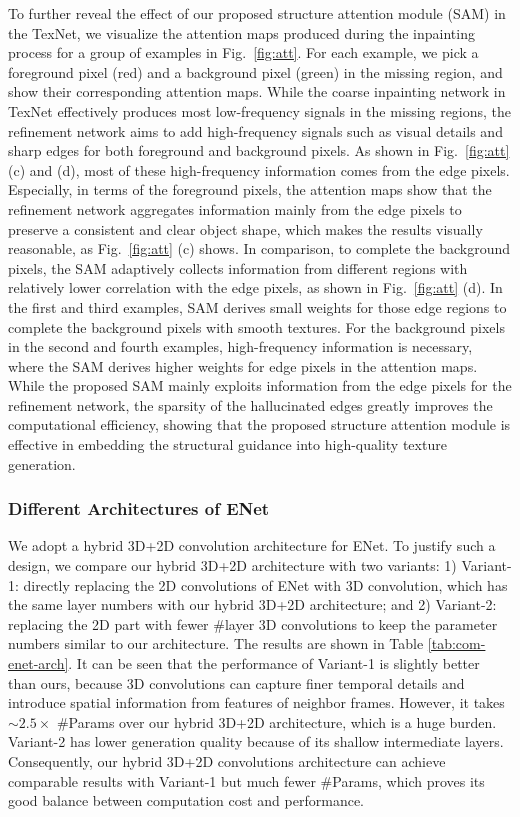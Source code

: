 To further reveal the effect of our proposed structure attention module (SAM) in the TexNet, we visualize the attention maps produced during the inpainting process for a group of examples in Fig.~\ref{fig:att}.
For each example, we pick a foreground pixel (red) and a background pixel (green) in the missing region, and show their corresponding attention maps.
%
While the coarse inpainting network in TexNet effectively produces most low-frequency signals in the missing regions, the refinement network aims to add high-frequency signals such as visual details and sharp edges for both foreground and background pixels.
%
As shown in Fig.~\ref{fig:att} (c) and (d), most of these high-frequency information comes from the edge pixels.
%
Especially, in terms of the foreground pixels, the attention maps show that the refinement network aggregates information mainly from the edge pixels to preserve a consistent and clear object shape, which makes the results visually reasonable, as Fig.~\ref{fig:att} (c) shows.
In comparison, to complete the background pixels, the SAM adaptively collects information from different regions with relatively lower correlation with the edge pixels, as shown in Fig.~\ref{fig:att} (d).
%
In the first and third examples, SAM derives small weights for those edge regions to complete the background pixels with smooth textures. 
For the background pixels in the second and fourth examples, high-frequency information is necessary, where the SAM derives higher weights for edge pixels in the attention maps.  
%
While the proposed SAM mainly exploits information from the edge pixels for the refinement network, the sparsity of the hallucinated edges greatly improves the computational efficiency, showing that the proposed structure attention module is effective in embedding the structural guidance into high-quality texture generation.



{\color{blue}
\subsubsection{Different Architectures of ENet}
We adopt a hybrid 3D+2D convolution architecture for ENet. To justify such a design, we compare our hybrid 3D+2D architecture with two variants: 1) Variant-1: directly replacing the 2D convolutions of ENet with 3D convolution, which has the same layer numbers with our hybrid 3D+2D architecture; and 2) Variant-2: replacing the 2D part with fewer \#layer 3D convolutions to keep the parameter numbers similar to our architecture. The results are shown in Table \ref{tab:com-enet-arch}. It can be seen that the performance of Variant-1 is slightly better than ours, because 3D convolutions can capture finer temporal details and introduce spatial information from features of neighbor frames. However, it takes $\sim2.5\times$ \#Params over our hybrid 3D+2D architecture, which is a huge burden. Variant-2 has lower generation quality because of its shallow intermediate layers. Consequently, our hybrid 3D+2D convolutions architecture can achieve comparable results with Variant-1 but much fewer \#Params, which proves its good balance between computation cost and performance.

}

